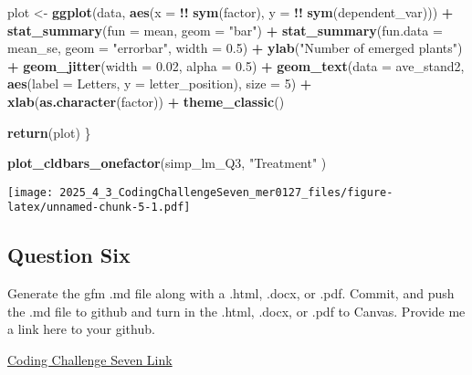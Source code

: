 \documentclass[
  12pt,
]{article}
\newenvironment{Shaded}{\begin{snugshade}}{\end{snugshade}}
\newcommand{\AttributeTok}[1]{\textcolor[rgb]{0.13,0.29,0.53}{#1}}
\newcommand{\DecValTok}[1]{\textcolor[rgb]{0.00,0.00,0.81}{#1}}
\newcommand{\FloatTok}[1]{\textcolor[rgb]{0.00,0.00,0.81}{#1}}
\newcommand{\FunctionTok}[1]{\textcolor[rgb]{0.13,0.29,0.53}{\textbf{#1}}}
\newcommand{\NormalTok}[1]{#1}
\newcommand{\OtherTok}[1]{\textcolor[rgb]{0.56,0.35,0.01}{#1}}
\newcommand{\SpecialCharTok}[1]{\textcolor[rgb]{0.81,0.36,0.00}{\textbf{#1}}}
\newcommand{\StringTok}[1]{\textcolor[rgb]{0.31,0.60,0.02}{#1}}
\begin{document}
\begin{Shaded}
\begin{Highlighting}[]
\NormalTok{  plot }\OtherTok{\textless{}{-}} \FunctionTok{ggplot}\NormalTok{(data, }\FunctionTok{aes}\NormalTok{(}\AttributeTok{x =} \SpecialCharTok{!!} \FunctionTok{sym}\NormalTok{(factor), }\AttributeTok{y =} \SpecialCharTok{!!} \FunctionTok{sym}\NormalTok{(dependent\_var))) }\SpecialCharTok{+} 
    \FunctionTok{stat\_summary}\NormalTok{(}\AttributeTok{fun =}\NormalTok{ mean, }\AttributeTok{geom =} \StringTok{"bar"}\NormalTok{) }\SpecialCharTok{+}
    \FunctionTok{stat\_summary}\NormalTok{(}\AttributeTok{fun.data =}\NormalTok{ mean\_se, }\AttributeTok{geom =} \StringTok{"errorbar"}\NormalTok{, }\AttributeTok{width =} \FloatTok{0.5}\NormalTok{) }\SpecialCharTok{+}
    \FunctionTok{ylab}\NormalTok{(}\StringTok{"Number of emerged plants"}\NormalTok{) }\SpecialCharTok{+} 
    \FunctionTok{geom\_jitter}\NormalTok{(}\AttributeTok{width =} \FloatTok{0.02}\NormalTok{, }\AttributeTok{alpha =} \FloatTok{0.5}\NormalTok{) }\SpecialCharTok{+}
    \FunctionTok{geom\_text}\NormalTok{(}\AttributeTok{data =}\NormalTok{ ave\_stand2, }\FunctionTok{aes}\NormalTok{(}\AttributeTok{label =}\NormalTok{ Letters, }\AttributeTok{y =}\NormalTok{ letter\_position), }
              \AttributeTok{size =} \DecValTok{5}\NormalTok{) }\SpecialCharTok{+}
    \FunctionTok{xlab}\NormalTok{(}\FunctionTok{as.character}\NormalTok{(factor)) }\SpecialCharTok{+}
    \FunctionTok{theme\_classic}\NormalTok{()}
  
  \FunctionTok{return}\NormalTok{(plot)}
\NormalTok{\}}

\FunctionTok{plot\_cldbars\_onefactor}\NormalTok{(simp\_lm\_Q3, }\StringTok{"Treatment"}\NormalTok{ )}
\end{Highlighting}
\end{Shaded}

\texttt{[image: 2025\_4\_3\_CodingChallengeSeven\_mer0127\_files/figure-latex/unnamed-chunk-5-1.pdf]}

\subsection{Question Six}\label{question-six}

Generate the gfm .md file along with a .html, .docx, or .pdf. Commit,
and push the .md file to github and turn in the .html, .docx, or .pdf to
Canvas. Provide me a link here to your github.

\href{https://github.com/Mads-Hamrick/ENTM6820class/tree/89f9f8cb2ed9120e3835c943c98f6a304e9b0aad/2025_4_3_CodingChallengeSeven_mer0127}{Coding
Challenge Seven Link}
\end{document}
